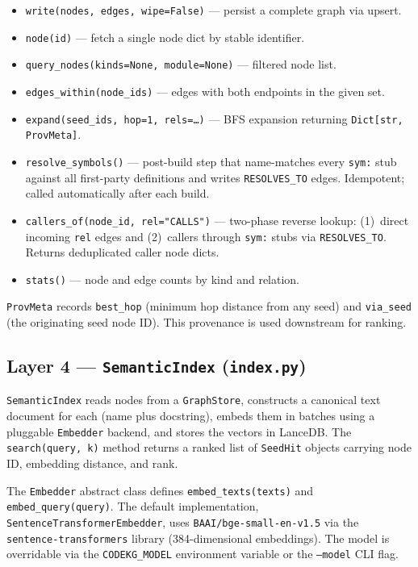 \documentclass[10pt]{article}
\begin{document}
\begin{itemize}
\item \texttt{write(nodes, edges, wipe=False)} --- persist a complete graph via
upsert.
\item \texttt{node(id)} --- fetch a single node dict by stable identifier.
\item \texttt{query\_nodes(kinds=None, module=None)} --- filtered node list.
\item \texttt{edges\_within(node\_ids)} --- edges with both endpoints in the given
set.
\item \texttt{expand(seed\_ids, hop=1, rels=\ldots)} --- BFS expansion returning
\texttt{Dict[str, ProvMeta]}.
\item \texttt{resolve\_symbols()} --- post-build step that name-matches every
\texttt{sym:} stub against all first-party definitions and writes
\texttt{RESOLVES\_TO} edges. Idempotent; called automatically after each build.
\item \texttt{callers\_of(node\_id, rel="CALLS")} --- two-phase reverse lookup:
(1)~direct incoming \texttt{rel} edges and (2)~callers through \texttt{sym:} stubs
via \texttt{RESOLVES\_TO}. Returns deduplicated caller node dicts.
\item \texttt{stats()} --- node and edge counts by kind and relation.
\end{itemize}

\texttt{ProvMeta} records \texttt{best\_hop} (minimum hop distance from any seed)
and \texttt{via\_seed} (the originating seed node ID). This provenance is used
downstream for ranking.

\subsection{Layer 4 --- \texttt{SemanticIndex} (\texttt{index.py})}

\texttt{SemanticIndex} reads nodes from a \texttt{GraphStore}, constructs a
canonical text document for each (name plus docstring), embeds them in batches
using a pluggable \texttt{Embedder} backend, and stores the vectors in LanceDB.
The \texttt{search(query, k)} method returns a ranked list of \texttt{SeedHit}
objects carrying node ID, embedding distance, and rank.

The \texttt{Embedder} abstract class defines \texttt{embed\_texts(texts)} and
\texttt{embed\_query(query)}. The default implementation,
\texttt{SentenceTransformerEmbedder}, uses \texttt{BAAI/bge-small-en-v1.5}
via the \texttt{sentence-transformers} library (384-dimensional embeddings).
The model is overridable via the \texttt{CODEKG\_MODEL} environment variable or
the \texttt{--model} CLI flag.
\end{document}

